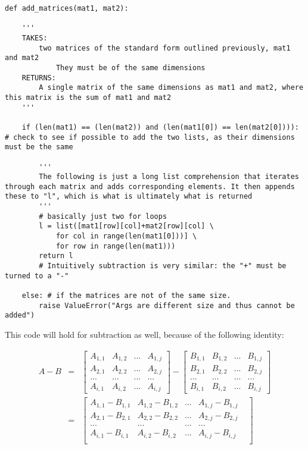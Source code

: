 \documentclass[12pt, a4paper]{article}
\begin{document}
\begin{lstlisting}
def add_matrices(mat1, mat2): 

    '''
    TAKES:
        two matrices of the standard form outlined previously, mat1 and mat2
            They must be of the same dimensions
    RETURNS:
        A single matrix of the same dimensions as mat1 and mat2, where this matrix is the sum of mat1 and mat2
    '''

    if (len(mat1) == (len(mat2)) and (len(mat1[0]) == len(mat2[0]))): # check to see if possible to add the two lists, as their dimensions must be the same

        '''
        The following is just a long list comprehension that iterates through each matrix and adds corresponding elements. It then appends these to "l", which is what is ultimately what is returned
        '''
        # basically just two for loops
        l = list([mat1[row][col]+mat2[row][col] \ 
            for col in range(len(mat1[0]))] \ 
            for row in range(len(mat1)))
        return l 
        # Intuitively subtraction is very similar: the "+" must be turned to a "-"

    else: # if the matrices are not of the same size.
        raise ValueError("Args are different size and thus cannot be added")

\end{lstlisting}

This code will hold for subtraction as well, because of the following identity:

\begin{eqnarray*}
    A - B & = & \begin{bmatrix}
        A_{1,1}  & A_{1,2} & ... & A_{1,j}\\
        A_{2,1} & A_{2,2} & ... & A_{2,j}\\
        ... & ... & ... & ... \\
        A_{i,1} & A_{i,2} & ... & A_{i,j}
    \end{bmatrix} - \begin{bmatrix}
        B_{1,1}  & B_{1,2} & ... & B_{1,j}\\
        B_{2,1} & B_{2,2} & ... & B_{2,j}\\
        ... & ... & ... & ... \\
        B_{i,1} & B_{i,2} & ... & B_{i,j}
    \end{bmatrix} \\
    & = & \begin{bmatrix}
        A_{1,1} - B_{1,1} & A_{1,2} - B_{1,2} & ... & A_{1,j} - B_{1,j} \\
        A_{2,1} - B_{2,1} & A_{2,2} - B_{2,2} & ... & A_{2,j} - B_{2,j} \\
        ... & ... & ... & ... & \\
        A_{i,1} - B_{i,1} & A_{i,2} - B_{i,2} & ... & A_{i,j} - B_{i,j} \\
    \end{bmatrix}
\end{eqnarray*}
\end{document}

